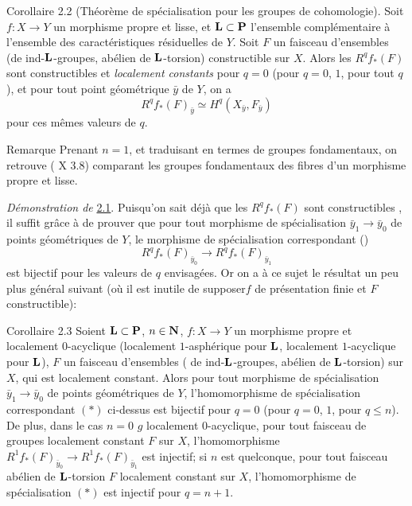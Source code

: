 \documentclass[10pt]{../fichiers-configuration-latex/smfart}
\begin{document}
\begin{enonce*}{Corollaire 2.2}
(Théorème de spécialisation pour les groupes de cohomologie). Soit
  $f:X\rightarrow Y$ un morphisme propre et lisse, et
  $\mathbf{L}\subset \mathbf{P}$ l'ensemble complémentaire à
  l'ensemble des caractéristiques résiduelles de $Y$. Soit $F$ un
  faisceau d'ensembles (\resp de ind-$\mathbf{L}$-groupes, \resp
  abélien de $\mathbf{L}$-torsion) constructible sur $X$. Alors les
  $R^{q}f_{\ast}(F)$ sont constructibles et \emph{localement
  constants} pour $q=0$ (\resp pour $q=0$, $1$, \resp pour tout $q$),
  et pour tout point géométrique $\bar{y}$ de $Y$, on a
$$
R^{q}f_{\ast}(F)_{\bar{y}}\simeq H^{q}(X_{\bar{y}},F_{\bar{y}})
$$
pour ces mêmes valeurs de $q$.
\end{enonce*}

\begin{enonce*}[remark]{Remarque}
Prenant $n=1$, et traduisant en termes de groupes fondamentaux, on
retrouve ( X 3.8) comparant les groupes fondamentaux des fibres
d'un morphisme propre et lisse.
\end{enonce*}

\noindent
\emph{Démonstration de} \hyperref[XVI.thm2.1]{2.1}. Puisqu'on sait déjà que les
$R^{q}f_{\ast}(F)$ sont constructibles , il suffit grâce à 
 de prouver que pour tout morphisme de spécialisation
$\bar{y}_1\rightarrow \bar{y}_{0}$ de points géométriques de $Y$,
le morphisme de spécialisation correspondant ()
\begin{equation*}
R^{q}f_{\ast}(F)_{\bar{y}_{0}}\longrightarrow
R^{q}f_{\ast}(F)_{\bar{y}_1}\tag{$\ast$}
\end{equation*}
est bijectif pour les valeurs de $q$ envisagées. Or on a à ce sujet le
résultat un peu plus général suivant (où il est inutile de
supposer\pageoriginale $f$ de présentation finie et $F$ constructible):

\begin{enonce*}{Corollaire 2.3}
Soient $\mathbf{L}\subset \mathbf{P}$, $n\in \mathbf{N}$,
$f:X\rightarrow Y$ un morphisme propre et localement $0$-acyclique
(\resp localement $1$-asphérique pour $\mathbf{L}$, \resp localement
$1$-acyclique pour $\mathbf{L}$), $F$ un faisceau d'ensembles (\resp
de ind-$\mathbf{L}$-groupes, \resp abélien de $\mathbf{L}$-torsion)
sur $X$, qui est localement constant. Alors pour tout morphisme de
spécialisation $\bar{y}_1\rightarrow \bar{y}_0$ de points géométriques
de $Y$, l'homomorphisme de spécialisation correspondant $(\ast)$
ci-dessus est bijectif pour $q=0$ (\resp pour $q=0$, $1$, \resp pour
$q\leq n$). De plus, dans le cas $n=0$ \ie $g$ localement
$0$-acyclique, pour tout faisceau de groupes localement constant $F$
sur $X$, l'homomorphisme $R^{1}f_{\ast}(F)_{\bar{y}_0}\rightarrow
R^{1}f_{\ast}(F)_{\bar{y}_1}$ est injectif; si $n$ est quelconque,
pour tout faisceau abélien de $\mathbf{L}$-torsion $F$ localement
constant sur $X$, l'homomorphisme de spécialisation $(\ast)$ est
injectif pour $q=n+1$.
\end{enonce*}
\end{document}
